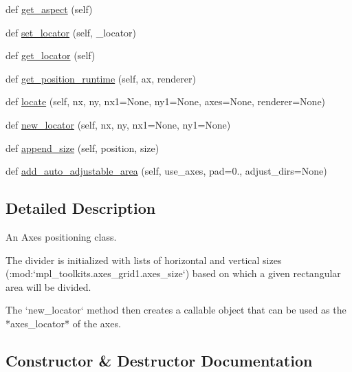 \begin{DoxyCompactItemize}
\item 
def \hyperlink{classaxes__grid1_1_1axes__divider_1_1Divider_ac0f244305a31e3c0d8e9e469491c4968}{get\+\_\+aspect} (self)
\item 
def \hyperlink{classaxes__grid1_1_1axes__divider_1_1Divider_aeeaf704f7b96c654757dd339941ad43e}{set\+\_\+locator} (self, \+\_\+locator)
\item 
def \hyperlink{classaxes__grid1_1_1axes__divider_1_1Divider_ad12b52b4d5f24dd8e3afbc635a43c2b9}{get\+\_\+locator} (self)
\item 
def \hyperlink{classaxes__grid1_1_1axes__divider_1_1Divider_aba45f914dcdf43337999aa7c7c29e0df}{get\+\_\+position\+\_\+runtime} (self, ax, renderer)
\item 
def \hyperlink{classaxes__grid1_1_1axes__divider_1_1Divider_abb22364324711ba007a30c25da994bd2}{locate} (self, nx, ny, nx1=None, ny1=None, axes=None, renderer=None)
\item 
def \hyperlink{classaxes__grid1_1_1axes__divider_1_1Divider_a1c119785520c4cd9109236ee86ace06e}{new\+\_\+locator} (self, nx, ny, nx1=None, ny1=None)
\item 
def \hyperlink{classaxes__grid1_1_1axes__divider_1_1Divider_aecc955f3a29d9ee006e36ad2ef6edddb}{append\+\_\+size} (self, position, size)
\item 
def \hyperlink{classaxes__grid1_1_1axes__divider_1_1Divider_a2419ca7e83c8de2445c725e6d1c770e5}{add\+\_\+auto\+\_\+adjustable\+\_\+area} (self, use\+\_\+axes, pad=0., adjust\+\_\+dirs=None)
\end{DoxyCompactItemize}


\subsection{Detailed Description}
\begin{DoxyVerb}An Axes positioning class.

The divider is initialized with lists of horizontal and vertical sizes
(:mod:`mpl_toolkits.axes_grid1.axes_size`) based on which a given
rectangular area will be divided.

The `new_locator` method then creates a callable object
that can be used as the *axes_locator* of the axes.
\end{DoxyVerb}
 

\subsection{Constructor \& Destructor Documentation}
\mbox{\label{classaxes__grid1_1_1axes__divider_1_1Divider_af36be90f43cba49ff444e0e17969c109}} 

